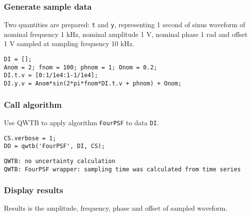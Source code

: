 \startcontents[localtoc]



{}
\subsubsection*{Generate sample data}



Two quantities are prepared: \texttt{t} and \texttt{y}, representing 1 second of sinus waveform of nominal
frequency 1 kHz, nominal amplitude 1 V, nominal phase 1 rad and offset 1 V sampled at sampling
frequency 10 kHz.

\begin{lstlisting}
DI = [];
Anom = 2; fnom = 100; phnom = 1; Onom = 0.2;
DI.t.v = [0:1/1e4:1-1/1e4];
DI.y.v = Anom*sin(2*pi*fnom*DI.t.v + phnom) + Onom;
\end{lstlisting}


{}
\subsubsection*{Call algorithm}



Use QWTB to apply algorithm \texttt{FourPSF} to data \texttt{DI}.

\begin{lstlisting}
CS.verbose = 1;
DO = qwtb('FourPSF', DI, CS);
\end{lstlisting}
\begin{lstlisting}[language={},xleftmargin=5pt,frame=none]
QWTB: no uncertainty calculation
QWTB: FourPSF wrapper: sampling time was calculated from time series

\end{lstlisting}


{}
\subsubsection*{Display results}



Results is the amplitude, frequency, phase and offset of sampled waveform.

